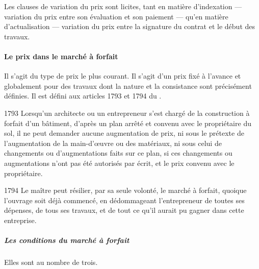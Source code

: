 				Les clauses de variation du prix sont licites, tant en matière d'indexation --- variation du prix entre son évaluation et son paiement --- qu'en matière d'actualisation --- variation du prix entre la signature du contrat et le début des travaux.

				\paragraph{Le prix dans le marché à forfait}

					Il s'agit du type de prix le plus courant. Il s'agit d'un prix fixé à l'avance et globalement pour des travaux dont la nature et la consistance sont précisément définies. Il est défini aux articles 1793 et 1794 du \cciv.

					\begin{citationArticleCciv}{1793}
						Lorsqu'un architecte ou un entrepreneur s'est chargé de la construction à forfait d'un bâtiment, d'après un plan arrêté et convenu avec le propriétaire du sol, il ne peut demander aucune augmentation de prix, ni sous le prétexte de l'augmentation de la main-d'œuvre ou des matériaux, ni sous celui de changements ou d'augmentations faits sur ce plan, si ces changements ou augmentations n'ont pas été autorisés par écrit, et le prix convenu avec le propriétaire.
					\end{citationArticleCciv}

					\begin{citationArticleCciv}{1794}
						Le maître peut résilier, par sa seule volonté, le marché à forfait, quoique l'ouvrage soit déjà commencé, en dédommageant l'entrepreneur de toutes ses dépenses, de tous ses travaux, et de tout ce qu'il aurait pu gagner dans cette entreprise.
					\end{citationArticleCciv}

					\subparagraph{Les conditions du marché à forfait}

					Elles sont au nombre de trois.

